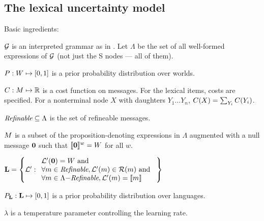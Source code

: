 \documentclass{article}
\begin{document}

\subsection{The lexical uncertainty model}\label{sec:model}

\begin{examples}
\item\label{modobjects} Basic ingredients:
  \begin{examples}
  \item $\mathcal{G}$ is an interpreted grammar as in . Let
    $\Lambda$ be the set of all well-formed expressions of $\mathcal{G}$
    (not just the S nodes --- all of them).

  \item $P : W \mapsto [0,1]$ is a prior probability
    distribution over worlds.

  \item $C : M \mapsto \mathbb{R}$ is a cost function on
    messages.  For the lexical items, costs are specified. For a
    nonterminal node $X$ with daughters $Y_{1} \ldots Y_{n}$,
    $C(X) = \sum_{Y_{i}}C(Y_{i})$.

  \item\label{enrichable}%
    $\textit{Refinable} \subseteq \Lambda$ is the set of refineable messages.

  \item $M$ is a subset of the proposition-denoting
    expressions in $\Lambda$ augmented with a null message $\mathbf{0}$
    such that $\llbracket\text{$\mathbf{0}$}\rrbracket^{w} = W$ for all $w$.

  \item\label{lexset}%
    $\mathbf{L} = \left\{ \mathcal{L}' :       
      \begin{array}[c]{l}
        \mathcal{L}'(\mathbf{0}) = W \text{ and } \\ 
        \forall m \in \textit{Refinable}, \mathcal{L}'(m) \in \mathcal{R}(m) \text{ and } \\
        \forall m \in \Lambda{-}\textit{Refinable}, \mathcal{L}'(m) = \llbracket m\rrbracket
      \end{array} \right\}$
  
  \item $P_{\mathbf{L}} : \mathbf{L} \mapsto [0,1]$ is a prior probability distribution over languages.    
  
  \item $\lambda$ is a temperature parameter controlling the learning rate.
  \end{examples}


\end{examples}
\end{document}
